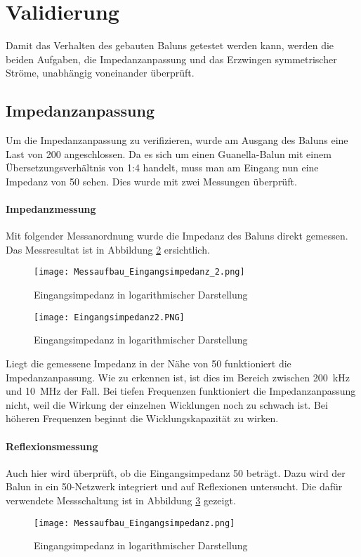 \section{Validierung}
Damit das Verhalten des gebauten Baluns getestet werden kann, werden die beiden Aufgaben, die Impedanzanpassung und das Erzwingen symmetrischer Ströme, unabhängig voneinander überprüft.
\subsection{Impedanzanpassung}
Um die Impedanzanpassung zu verifizieren, wurde am Ausgang des Baluns eine Last von \SI{200}{\Omega} angeschlossen. Da es sich um einen Guanella-Balun mit einem Übersetzungsverhältnis von 1:4 handelt, muss man am Eingang nun eine Impedanz von \SI{50}{\Omega} sehen. Dies wurde mit zwei Messungen überprüft.

\paragraph{Impedanzmessung}
Mit folgender Messanordnung wurde die Impedanz des Baluns direkt gemessen. Das Messresultat ist in Abbildung \ref{fig:Eingangsimpedanz2} ersichtlich.
\begin{figure}[H]
	\centering
	\texttt{[image: Messaufbau\_Eingangsimpedanz\_2.png]}
	\caption{Eingangsimpedanz in logarithmischer Darstellung}\label{fig:mess_eingangsimpedanz2}
\end{figure}

\begin{figure}[H]
	\centering
	\texttt{[image: Eingangsimpedanz2.PNG]}
	\caption{Eingangsimpedanz in logarithmischer Darstellung}\label{fig:Eingangsimpedanz2}
\end{figure}
Liegt die gemessene Impedanz in der Nähe von \SI{50}{\Omega} funktioniert die Impedanzanpassung. Wie zu erkennen ist, ist dies im Bereich zwischen \SI{200}{kHz} und \SI{10}{MHz} der Fall. Bei tiefen Frequenzen funktioniert die Impedanzanpassung nicht, weil die Wirkung der einzelnen Wicklungen noch zu schwach ist. Bei höheren Frequenzen beginnt die Wicklungskapazität zu wirken.

\paragraph{Reflexionsmessung}
Auch hier wird überprüft, ob die Eingangsimpedanz \SI{50}{\Omega} beträgt. Dazu wird der Balun in ein \SI{50}{\Omega}-Netzwerk integriert und auf Reflexionen untersucht. Die dafür verwendete Messschaltung ist in Abbildung \ref{fig:mess_eingangsimpedanz} gezeigt.
\begin{figure}[H]
	\centering
	\texttt{[image: Messaufbau\_Eingangsimpedanz.png]}
	\caption{Eingangsimpedanz in logarithmischer Darstellung}\label{fig:mess_eingangsimpedanz}
\end{figure}

